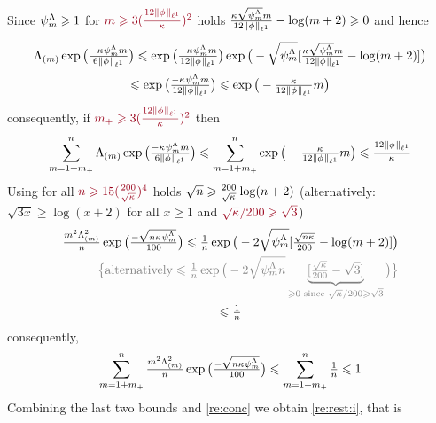 \begin{pro}
Since $\cmiSv\geq1$ for $\dr\Di\geq
3(\tfrac{12\Vnormlp[1]{\fydf}}{\cpen})^2$ 
holds
$\tfrac{\cpen\sqrt{\cmSv}\Di}{12\Vnormlp[1]{\fydf}}-\log(\Di+2)\geq0$
and hence
\begin{multline*}
\miSv\exp\big(\tfrac{-\cpen\cmSv\Di}{6\Vnormlp[1]{\fydf}}\big)\leq
\exp\big(\tfrac{-\cpen\cmSv\Di}{12\Vnormlp[1]{\fydf}}\big)\exp\big(-\sqrt{\cmSv}[\tfrac{\cpen\sqrt{\cmSv}\Di}{12\Vnormlp[1]{\fydf}}-\log(\Di+2)]\big)
\\\leq\exp\big(\tfrac{-\cpen\cmSv\Di}{12\Vnormlp[1]{\fydf}}\big)\leq\exp\big(-\tfrac{\cpen}{12\Vnormlp[1]{\fydf}}\Di\big)
\end{multline*}
consequently, if $\dr\pDi\geq 3(\tfrac{12\Vnormlp[1]{\fydf}}{\cpen})^2$ then
\begin{multline*}
\sum_{\Di=1+\pDi}^{\ssY}\miSv\exp\big(\tfrac{-\cpen\cmSv\Di}{6\Vnormlp[1]{\fydf}}\big)\leq
\sum_{\Di=1+\pDi}^{\ssY}\exp\big(-\tfrac{\cpen}{12\Vnormlp[1]{\fydf}}\Di\big)
\leq \tfrac{12\Vnormlp[1]{\fydf}}{\cpen}
\end{multline*}
Using for all $\dr n\geq 15(\tfrac{200}{\sqrt{\cpen}})^4$ holds $\sqrt{n}\geq\tfrac{200}{\sqrt{\cpen}}\log(n+2)$
({\dgrau alternatively: $\sqrt{3x}\geq\log(x+2)$ for all $x\geq1$ and
$\dr\sqrt{\cpen}/200\geq\sqrt{3}$})
\begin{multline*}
\tfrac{\Di^2\miSv^2}{\ssY}\exp\big(\tfrac{-\sqrt{n\cpen\cmSv}}{100}\big)
\leq
\tfrac{1}{\ssY}\exp\big(-2\sqrt{\cmSv}[\tfrac{\sqrt{\ssY\cpen}}{200}-\log(\Di+2)]\big)\\\hfill\dgrau\big\{\text{alternatively}\leq
\tfrac{1}{\ssY}\exp\big(-2\sqrt{\cmSv\ssY}\underbrace{[\tfrac{\sqrt{\cpen}}{200}-\sqrt{3}]}_{\geq0\text{
    since } \sqrt{\cpen}/200\geq\sqrt{3}}\big)\big\}\\\leq \tfrac{1}{\ssY}
\end{multline*}
consequently, 
\begin{equation*}
\sum_{\Di=1+\pDi}^{\ssY}\tfrac{\Di^2\miSv^2}{\ssY}\exp\big(\tfrac{-\sqrt{n\cpen\cmSv}}{100}\big)\leq\sum_{\Di=1+\pDi}^{\ssY}\tfrac{1}{\ssY}\leq1
\end{equation*}
Combining the last two bounds and \cref{re:conc} we obtain \ref{re:rest:i}, that is 
\begin{multline*}

\end{multline*}
\end{pro}
